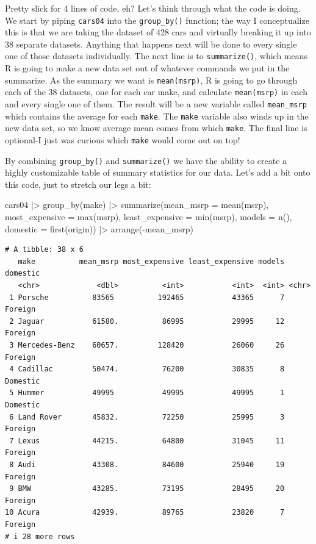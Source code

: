\documentclass[
  letterpaper,
]{book}
\newenvironment{Shaded}{\begin{snugshade}}{\end{snugshade}}
\newcommand{\AttributeTok}[1]{\textcolor[rgb]{0.40,0.45,0.13}{#1}}
\newcommand{\FunctionTok}[1]{\textcolor[rgb]{0.28,0.35,0.67}{#1}}
\newcommand{\NormalTok}[1]{\textcolor[rgb]{0.00,0.23,0.31}{#1}}
\newcommand{\SpecialCharTok}[1]{\textcolor[rgb]{0.37,0.37,0.37}{#1}}
\begin{document}
Pretty slick for 4 lines of code, eh? Let's think through what the code
is doing. We start by piping \texttt{cars04} into the
\texttt{group\_by()} function; the way I conceptualize this is that we
are taking the dataset of 428 cars and virtually breaking it up into 38
separate datasets. Anything that happens next will be done to every
single one of those datasets individually. The next line is to
\texttt{summarize()}, which means R is going to make a new data set out
of whatever commands we put in the summarize. As the summary we want is
\texttt{mean(msrp)}, R is going to go through each of the 38 datasets,
one for each car make, and calculate \texttt{mean(msrp)} in each and
every single one of them. The result will be a new variable called
\texttt{mean\_msrp} which contains the average for each \texttt{make}.
The \texttt{make} variable also winds up in the new data set, so we know
average mean comes from which \texttt{make}. The final line is
optional-I just was curious which \texttt{make} would come out on top!

By combining \texttt{group\_by()} and \texttt{summarize()} we have the
ability to create a highly customizable table of summary statistics for
our data. Let's add a bit onto this code, just to stretch our legs a
bit:

\begin{Shaded}
\begin{Highlighting}[]
\NormalTok{cars04 }\SpecialCharTok{|\textgreater{}} 
  \FunctionTok{group\_by}\NormalTok{(make) }\SpecialCharTok{|\textgreater{}} 
  \FunctionTok{summarize}\NormalTok{(}\AttributeTok{mean\_msrp =} \FunctionTok{mean}\NormalTok{(msrp),}
            \AttributeTok{most\_expensive =} \FunctionTok{max}\NormalTok{(msrp),}
            \AttributeTok{least\_expensive =} \FunctionTok{min}\NormalTok{(msrp),}
            \AttributeTok{models =} \FunctionTok{n}\NormalTok{(),}
            \AttributeTok{domestic =} \FunctionTok{first}\NormalTok{(origin)) }\SpecialCharTok{|\textgreater{}} 
  \FunctionTok{arrange}\NormalTok{(}\SpecialCharTok{{-}}\NormalTok{mean\_msrp) }
\end{Highlighting}
\end{Shaded}

\begin{verbatim}
# A tibble: 38 x 6
   make          mean_msrp most_expensive least_expensive models domestic
   <chr>             <dbl>          <int>           <int>  <int> <chr>   
 1 Porsche          83565          192465           43365      7 Foreign 
 2 Jaguar           61580.          86995           29995     12 Foreign 
 3 Mercedes-Benz    60657.         128420           26060     26 Foreign 
 4 Cadillac         50474.          76200           30835      8 Domestic
 5 Hummer           49995           49995           49995      1 Domestic
 6 Land Rover       45832.          72250           25995      3 Foreign 
 7 Lexus            44215.          64800           31045     11 Foreign 
 8 Audi             43308.          84600           25940     19 Foreign 
 9 BMW              43285.          73195           28495     20 Foreign 
10 Acura            42939.          89765           23820      7 Foreign 
# i 28 more rows
\end{verbatim}
\end{document}
